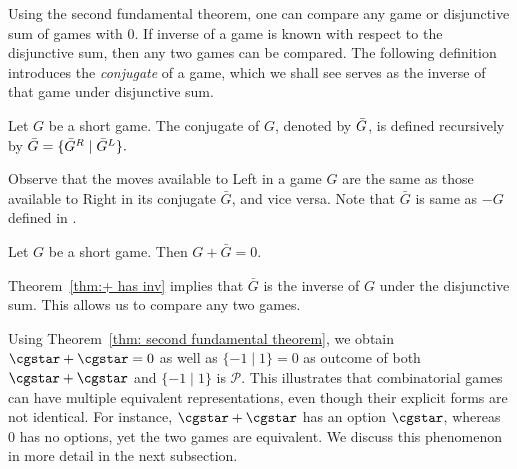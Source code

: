 \documentclass[oneside,reqno]{amsart}
\newcommand{\ur}[1]{\textcolor{blue}{#1}}
\newcommand{\pp}{\mathscr{P}}
\begin{document}
    Using the second fundamental theorem, one can compare any game or disjunctive sum of games with 0. If inverse of a game is known with respect to the disjunctive sum, then any two games can be compared. %
    The following definition introduces the \emph{conjugate} of a game, which we shall see serves as the inverse of that game under disjunctive sum.
    \begin{definition}[Conjugate]
        Let $G$ be a short game. The conjugate of $G$, denoted by $\Bar{G}$, is defined recursively by $\Bar{G} = \{\Bar{G}^R\mid \Bar{G}^L\}.$
    \end{definition}

    Observe that the moves available to Left in a game $G$ are the same as those available to Right in its conjugate $\bar{G}$, and vice versa. Note that $\bar{G}$ is same as $-G$ defined in \cite{S2013}.


    \begin{theorem}\label{thm:+ has inv}
        Let $G$ be a short game. Then $G+\bar{G}=0$.
    \end{theorem}
    Theorem~\ref{thm:+ has inv} implies that $\bar{G}$ is the inverse of $G$ under the disjunctive sum. This allows us to compare any two games.

     Using Theorem~\ref{thm: second fundamental theorem}, we obtain $\cgstar + \cgstar = 0$ as well as $\{-1 \mid 1\}=0$ as outcome of both $\cgstar+\cgstar$ and $\{-1\mid 1\}$ is $\pp$. This illustrates that combinatorial games can have multiple equivalent representations, even though their explicit forms are not identical. For instance, $\cgstar + \cgstar$ has an option $\cgstar$, whereas $0$ has no options, yet the two games are equivalent. We discuss this phenomenon in more detail in the next subsection.
\end{document}
